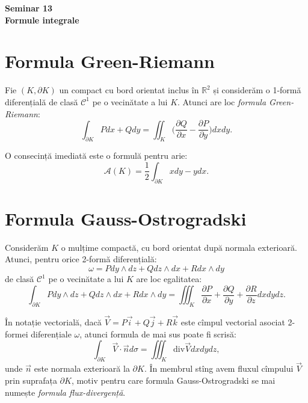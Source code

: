 \documentclass[11pt,a4paper]{article}
\newcommand\kal{\mathcal}
\newcommand\RR{\mathbb{R}}
\theoremstyle{dotless}
\theoremstyle{dotlessdr}
\begin{document}
\begin{center}
  {\large\textbf{Seminar 13 \\ Formule integrale}}
\end{center}

\vspace{1cm}

\section{Formula Green-Riemann}
\label{sec:g-r}

Fie $(K, \partial K)$ un compact cu bord orientat inclus în $\RR^2$ și considerăm
o 1-formă diferențială de clasă $\kal{C}^1$ pe o vecinătate a lui $K$. Atunci
are loc \emph{formula Green-Riemann}:
\[
  \int_{\partial K} Pdx + Qdy = \iint_K \Big(\frac{\partial Q}{\partial x} - %
  \frac{\partial P}{\partial y} \Big) dx dy.
\]

O consecință imediată este o formulă pentru arie:
\[
  \mathcal{A}(K) = \frac{1}{2} \int_{\partial K} xdy - ydx.
\]


\section{Formula Gauss-Ostrogradski}
\label{sec:g-o}

Considerăm $K$ o mulțime compactă, cu bord orientat după normala exterioară. Atunci,
pentru orice 2-formă diferențială:
\[
  \omega = Pdy \wedge dz + Q dz \wedge dx + R dx \wedge dy
\]
de clasă $\kal{C}^1$ pe o vecinătate a lui $K$ are loc egalitatea:
\[
  \int_{\partial K} P dy \wedge dz + Q dz \wedge dx + R dx \wedge dy = %
  \iiint_K \frac{\partial P}{\partial x} + \frac{\partial Q}{\partial y} + %
  \frac{\partial R}{\partial z} dxdydz.
\]

În notație vectorială, dacă $\vec{V} = P \vec{i} + Q \vec{j} + R \vec{k}$ este
cîmpul vectorial asociat 2-formei diferențiale $\omega$, atunci formula de mai sus
poate fi scrisă:
\[
  \int_{\partial K} \vec{V} \cdot \vec{n} d \sigma = \iiint_K \mathrm{div}\vec{V} dxdydz,
\]
unde $\vec{n}$ este normala exterioară la $\partial K$. În membrul stîng avem
fluxul cîmpului $\vec{V}$ prin suprafața $\partial K$, motiv pentru care formula
Gauss-Ostrogradski se mai numește \emph{formula flux-divergență}.

\end{document}
